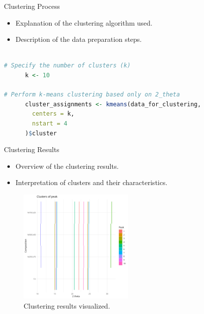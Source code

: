 \documentclass[aspectratio=169]{beamer}
\begin{document}
\begin{frame}[fragile]{Clustering Process}
    \begin{itemize}
        \item Explanation of the clustering algorithm used.
        \item Description of the data preparation steps.
    \end{itemize}

    \begin{lstlisting}[language=R, basicstyle=\small\ttfamily]
    
# Specify the number of clusters (k)
      k <- 10

# Perform k-means clustering based only on 2_theta
      cluster_assignments <- kmeans(data_for_clustering,
        centers = k,
        nstart = 4
      )$cluster

    \end{lstlisting}
\end{frame}

\begin{frame}{Clustering Results}
    \begin{itemize}
        \item Overview of the clustering results.
        \item Interpretation of clusters and their characteristics.
    \end{itemize}

    \begin{figure}
        \includegraphics[width=0.5\textwidth]{../plot/peak_clusters.png}
        \caption{Clustering results visualized.}
    \end{figure}
\end{frame}
\end{document}
